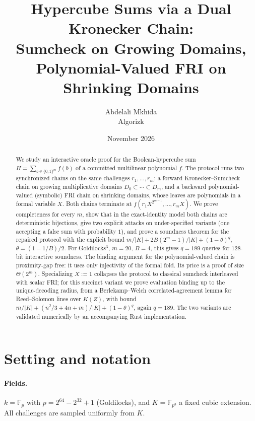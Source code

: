 \documentclass[11pt]{article}
\title{Hypercube Sums via a Dual Kronecker Chain:\\
Sumcheck on Growing Domains, Polynomial-Valued FRI on Shrinking Domains}
\author{Abdelali Mkhida\\ \small Algorizk}
\date{November 2026}
\theoremstyle{definition}
\newcommand{\F}{\mathbb{F}}
\newcommand{\K}{K}
\begin{document}
\maketitle

\begin{abstract}
We study an interactive oracle proof for the Boolean-hypercube sum $H=\sum_{b\in\{0,1\}^m} f(b)$ of a committed multilinear polynomial $f$. The protocol runs two synchronized chains on the same challenges $r_1,\dots,r_m$: a forward Kronecker--Sumcheck chain on growing multiplicative domains $D_0\subset\cdots\subset D_m$, and a backward polynomial-valued (symbolic) FRI chain on shrinking domains, whose leaves are polynomials in a formal variable $X$. Both chains terminate at $f(r_1X^{2^{m-1}},\dots,r_mX)$. We prove completeness for every $m$, show that in the exact-identity model both chains are deterministic bijections, give two explicit attacks on under-specified variants (one accepting a false sum with probability $1$), and prove a soundness theorem for the repaired protocol with the explicit bound $m/|\K|+2B(2^m-1)/|\K|+(1-\theta)^q$, $\theta=(1-1/B)/2$. For Goldilocks$^3$, $m=20$, $B=4$, this gives $q=189$ queries for $128$-bit interactive soundness. The binding argument for the polynomial-valued chain is proximity-gap free: it uses only injectivity of the formal fold. Its price is a proof of size $\Theta(2^m)$. Specializing $X:=1$ collapses the protocol to classical sumcheck interleaved with scalar FRI; for this succinct variant we prove evaluation binding up to the unique-decoding radius, from a Berlekamp--Welch correlated-agreement lemma for Reed--Solomon lines over $\K(Z)$, with bound $m/|\K|+(n^2/3+4n+m)/|\K|+(1-\theta)^q$, again $q=189$. The two variants are validated numerically by an accompanying Rust implementation.
\end{abstract}

\tableofcontents

\section{Setting and notation}

\paragraph{Fields.} $k=\F_p$ with $p=2^{64}-2^{32}+1$ (Goldilocks), and $\K=\F_{p^3}$ a fixed cubic extension. All challenges are sampled uniformly from $\K$.
\end{document}
